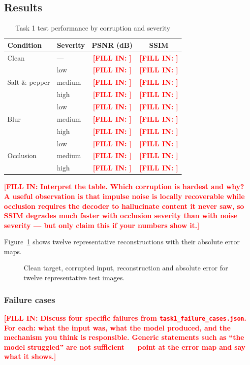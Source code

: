 \documentclass[conference]{IEEEtran}
\newcommand{\PLACEHOLDER}[1]{\textcolor{red}{\textbf{[FILL IN: #1]}}}
\begin{document}
\subsection{Results}
\begin{table}[t]
\caption{Task 1 test performance by corruption and severity}
\label{tab:task1results}
\centering
\begin{tabular}{@{}llcc@{}}
\toprule
\textbf{Condition} & \textbf{Severity} & \textbf{PSNR (dB)} & \textbf{SSIM} \\
\midrule
Clean & --- & \PLACEHOLDER{} & \PLACEHOLDER{} \\
\midrule
\multirow{3}{*}{Salt \& pepper} & low & \PLACEHOLDER{} & \PLACEHOLDER{} \\
 & medium & \PLACEHOLDER{} & \PLACEHOLDER{} \\
 & high & \PLACEHOLDER{} & \PLACEHOLDER{} \\
\midrule
\multirow{3}{*}{Blur} & low & \PLACEHOLDER{} & \PLACEHOLDER{} \\
 & medium & \PLACEHOLDER{} & \PLACEHOLDER{} \\
 & high & \PLACEHOLDER{} & \PLACEHOLDER{} \\
\midrule
\multirow{3}{*}{Occlusion} & low & \PLACEHOLDER{} & \PLACEHOLDER{} \\
 & medium & \PLACEHOLDER{} & \PLACEHOLDER{} \\
 & high & \PLACEHOLDER{} & \PLACEHOLDER{} \\
\bottomrule
\end{tabular}
\end{table}

\PLACEHOLDER{Interpret the table. Which corruption is hardest and why? A useful
observation is that impulse noise is locally recoverable while occlusion
requires the decoder to hallucinate content it never saw, so SSIM degrades much
faster with occlusion severity than with noise severity --- but only claim this
if your numbers show it.}

Figure~\ref{fig:task1samples} shows twelve representative reconstructions with
their absolute error maps.

\begin{figure}[t]
\centering
\caption{Clean target, corrupted input, reconstruction and absolute error for
twelve representative test images.}
\label{fig:task1samples}
\end{figure}

\subsubsection{Failure cases}
\PLACEHOLDER{Discuss four specific failures from
\texttt{task1\_failure\_cases.json}. For each: what the input was, what the
model produced, and the mechanism you think is responsible. Generic statements
such as ``the model struggled'' are not sufficient --- point at the error map
and say what it shows.}
\end{document}
